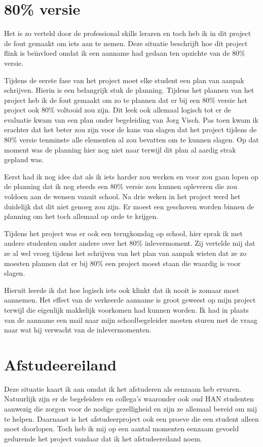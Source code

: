 \documentclass[a4paper, 11pt, oneside]{report}
\begin{document}
\section{80\% versie}\label{sec:altijd-navragen-nooit-aannemen}
Het is zo verteld door de professional skills leraren en toch heb ik in dit project de fout gemaakt om iets aan te nemen.
Deze situatie beschrijft hoe dit project flink is beïnvloed omdat ik een aanname had gedaan ten opzichte van de 80\% versie.

Tijdens de eerste fase van het project moet elke student een plan van aanpak schrijven. Hierin is een belangrijk stuk de planning. Tijdens het plannen van het project heb ik de fout gemaakt om zo te plannen dat er bij een 80\% versie het project ook 80\% voltooid zou zijn. Dit leek ook allemaal logisch tot er de evaluatie kwam van een plan onder begeleiding van Jorg Visch. Pas toen kwam ik erachter dat het beter zou zijn voor de kans van slagen dat het project tijdens de 80\% versie tenminste alle elementen al zou bevatten om te kunnen slagen. 
Op dat moment was de planning hier nog niet naar terwijl dit plan al aardig strak gepland was.

Eerst had ik nog idee dat als ik iets harder zou werken en voor zou gaan lopen op de planning dat ik nog steeds een 80\% versie zou kunnen opleveren die zou voldoen aan de wensen vanuit school. Na drie weken in het project werd het duidelijk dat dit niet genoeg zou zijn. Er moest een geschoven worden binnen de planning om het toch allemaal op orde te krijgen.

Tijdens het project was er ook een terugkomdag op school, hier sprak ik met andere studenten onder andere over het 80\% inlevermoment. Zij vertelde mij dat ze al wel vroeg tijdens het schrijven van het plan van aanpak wisten dat ze zo moesten plannen dat er bij 80\% een project moest staan die waardig is voor slagen.

Hieruit leerde ik dat hoe logisch iets ook klinkt dat ik nooit is zomaar moet aannemen. Het effect van de verkeerde aanname is groot geweest op mijn project terwijl die eigenlijk makkelijk voorkomen had kunnen worden. Ik had in plaats van de aanname een mail naar mijn schoolbegeleider moeten sturen met de vraag naar wat hij verwacht van de inlevermomenten.  
  


\section{Afstudeereiland}
Deze situatie kaart ik aan omdat ik het afstuderen als eenzaam heb ervaren.
Natuurlijk zijn er de begeleiders en collega's waaronder ook oud HAN studenten aanwezig die zorgen voor de nodige gezelligheid en zijn ze allemaal bereid om mij te helpen.
Daarnaast is het afstudeerproject ook een proeve die een student alleen moet doorlopen.
Toch heb ik mij op een aantal momenten eenzaam gevoeld gedurende het project vandaar dat ik het afstudeereiland noem.
\end{document}

